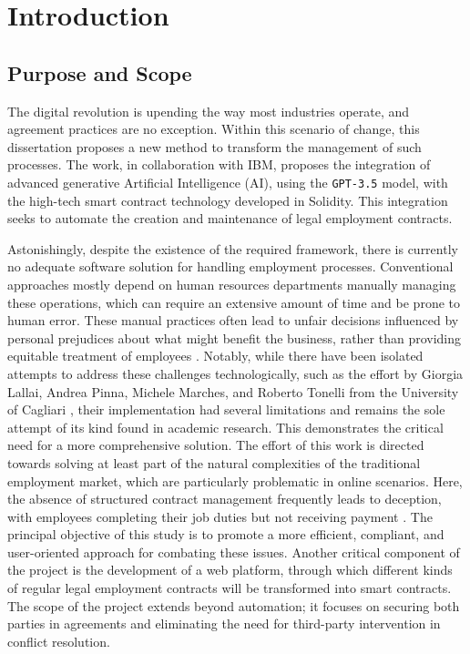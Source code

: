 \chapter{Introduction}

\section{Purpose and Scope}

The digital revolution is upending the way most industries operate, and agreement practices are no exception. Within this scenario of change, this dissertation proposes a new method to transform the management of such processes. The work, in collaboration with IBM, proposes the integration of advanced generative Artificial Intelligence (AI), using the \texttt{GPT-3.5} model, with the high-tech smart contract technology developed in Solidity. This integration seeks to automate the creation and maintenance of legal employment contracts.

Astonishingly, despite the existence of the required framework, there is currently no adequate software solution for handling employment processes. Conventional approaches mostly depend on human resources departments manually managing these operations, which can require an extensive amount of time and be prone to human error. These manual practices often lead to unfair decisions influenced by personal prejudices about what might benefit the business, rather than providing equitable treatment of employees \cite{Wax1998, SusanEtAl1995}. Notably, while there have been isolated attempts to address these challenges technologically, such as the effort by Giorgia Lallai, Andrea Pinna, Michele Marches, and Roberto Tonelli from the University of Cagliari \cite{lallaiETAL2020software}, their implementation had several limitations and remains the sole attempt of its kind found in academic research. This demonstrates the critical need for a more comprehensive solution. The effort of this work is directed towards solving at least part of the natural complexities of the traditional employment market, which are particularly problematic in online scenarios. Here, the absence of structured contract management frequently leads to deception, with employees completing their job duties but not receiving payment \cite{Howson2023, Shevchuk2018, Aleksynska2018, McGauran2016}. The principal objective of this study is to promote a more efficient, compliant, and user-oriented approach for combating these issues. Another critical component of the project is the development of a web platform, through which different kinds of regular legal employment contracts will be transformed into smart contracts. The scope of the project extends beyond automation; it focuses on securing both parties in agreements and eliminating the need for third-party intervention in conflict resolution.

